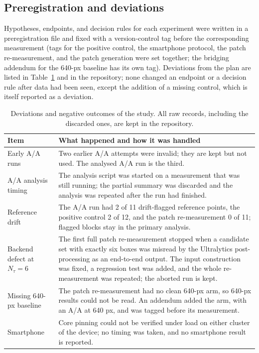 \documentclass[a4paper,fleqn]{cas-dc}
\newcommand{\Ntau}{N_{\tau}}
\begin{document}
\subsection{Preregistration and deviations}
Hypotheses, endpoints, and decision rules for each experiment were written in a preregistration file and fixed with a version-control tag before the corresponding measurement (tags for the positive control, the smartphone protocol, the patch re-measurement, and the patch generation were set together; the bridging addendum for the 640-px baseline has its own tag). Deviations from the plan are listed in Table~\ref{tab:dev} and in the repository; none changed an endpoint or a decision rule after data had been seen, except the addition of a missing control, which is itself reported as a deviation.

\begin{table}[t]
\centering\small
\caption{Deviations and negative outcomes of the study. All raw records, including the discarded ones, are kept in the repository.}
\label{tab:dev}
\begin{tabularx}{\columnwidth}{@{}lX@{}}
\toprule
Item & What happened and how it was handled \\
\midrule
Early A/A runs & Two earlier A/A attempts were invalid; they are kept but not used. The analysed A/A run is the third. \\
A/A analysis timing & The analysis script was started on a measurement that was still running; the partial summary was discarded and the analysis was repeated after the run had finished. \\
Reference drift & The A/A run had 2 of 11 drift-flagged reference points, the positive control 2 of 12, and the patch re-measurement 0 of 11; flagged blocks stay in the primary analysis. \\
Backend defect at $\Ntau=6$ & The first full patch re-measurement stopped when a candidate set with exactly six boxes was misread by the Ultralytics post-processing as an end-to-end output. The input construction was fixed, a regression test was added, and the whole re-measurement was repeated; the aborted run is kept. \\
Missing 640-px baseline & The patch re-measurement had no clean 640-px arm, so 640-px results could not be read. An addendum added the arm, with an A/A at 640 px, and was tagged before its measurement. \\
Smartphone & Core pinning could not be verified under load on either cluster of the device; no timing was taken, and no smartphone result is reported. \\
\bottomrule
\end{tabularx}
\end{table}
\end{document}
